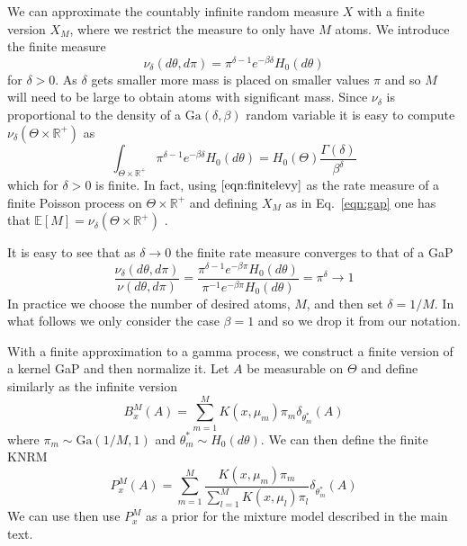 \documentclass{article} %
\newcommand{\reals}{\mathbb{R}}
\newcommand{\Ga}{\text{Ga}}
\newcommand{\E}{\mathbb{E}}
\begin{document}
We can approximate the countably infinite random measure $X$ with a finite
version $X_M$, where we restrict the measure to only have $M$ atoms.  We
introduce the finite measure
\begin{equation}
  \nu_\delta(d\theta,d\pi) = \pi^{\delta-1} e^{-\beta\delta} H_0(d\theta)
  \label{eqn:finitelevy}
\end{equation}
for $\delta > 0$.  As $\delta$ gets smaller more mass is placed on
smaller values $\pi$ and so $M$ will need to be large to obtain atoms with
significant mass.  Since $\nu_\delta$ is proportional to the density of a
$\Ga(\delta,\beta)$ random variable it is easy to compute $\nu_\delta(\Theta
\times \reals^+)$ as
\begin{equation}
  \int_{\Theta \times \reals^+} \pi^{\delta-1} e^{-\beta\delta} H_0(d\theta) =
  H_0(\Theta) \frac{\Gamma(\delta)}{\beta^\delta}
  \label{eqn:finitelevytotal}
\end{equation}
which for $\delta > 0$ is finite. In fact, using $\ref{eqn:finitelevy}$ as the
rate measure of a finite Poisson process on $\Theta \times \reals^+$ and
defining $X_M$ as in Eq.~\ref{eqn:gap} one has that
$\E[M] = \nu_\delta(\Theta \times \reals^+)$ \cite{Kingman:1993}.

It is easy to see that as $\delta \rightarrow 0$ the finite rate measure
converges to that of a GaP
\begin{equation}
  \frac{\nu_\delta(d\theta,d\pi)}{\nu(d\theta,d\pi)} = \frac{\pi^{\delta-1}
  e^{-\beta\pi} H_0(d\theta)}{ \pi^{-1} e^{-\beta\pi} H_0(d\theta)} =
  \pi^\delta \rightarrow 1
  \label{eqn:finitelimit}
\end{equation}
In practice we choose the number of
desired atoms, $M$, and then set $\delta = 1/M$.  
In what follows we only 
consider the case $\beta = 1$ and so we drop it from our notation.

With a finite approximation to a gamma process, we construct a finite
version of a kernel GaP and then normalize it.  Let $A$ be measurable on
$\Theta$ and
define similarly as the infinite version
\begin{equation}
  B^M_{x}(A) = \sum_{m=1}^M K(x,\mu_m)\pi_m \delta_{\theta^*_m}(A)
  \label{eqn:finitekcrm}
\end{equation}
where $\pi_m \sim \Ga(1/M,1)$ and $\theta^*_m \sim H_0(d\theta)$.  We can then
define the finite KNRM
\begin{equation}
  P^M_{x}(A) = \sum_{m=1}^M \frac{ K(x,\mu_m)\pi_m }{\sum_{l=1}^M K(x,\mu_l)\pi_l}
  \delta_{\theta^*_m}(A)
  \label{eqn:finiteknrm}
\end{equation}
We can use then use $P^M_x$ as a prior for the mixture model described in the main text. 
\end{document}
